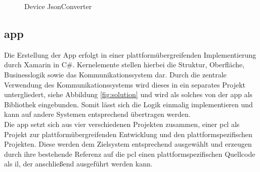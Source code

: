 \begin{figure}[h]
	\centering
	\qquad
	\caption{Device JsonConverter}
\end{figure}

\newpage
\subsection{\gls{app}}

Die Erstellung der App erfolgt in einer plattformübergreifenden Implementierung durch Xamarin in C\#. Kernelemente stellen hierbei die Struktur, Oberfläche, Businesslogik sowie das Kommunikationssystem dar. Durch die zentrale Verwendung des Kommunikationssystems wird dieses in ein separates Projekt untergliedert, siehe Abbildung \ref{fig:solution} und wird als solches von der \gls{app} als Bibliothek eingebunden. Somit lässt sich die Logik einmalig implementieren und kann auf andere Systemen entsprechend übertragen werden.\\
Die \gls{app} setzt sich aus vier verschiedenen Projekten zusammen, einer \acrshort{pcl} als Projekt zur plattformübergreifenden Entwicklung und den plattformspezifischen Projekten. Diese werden dem Zielsystem entsprechend ausgewählt und erzeugen durch ihre bestehende Referenz auf die \acrshort{pcl} einen plattformspezifischen Quellcode als \gls{il}, der anschließend ausgeführt werden kann.\\

